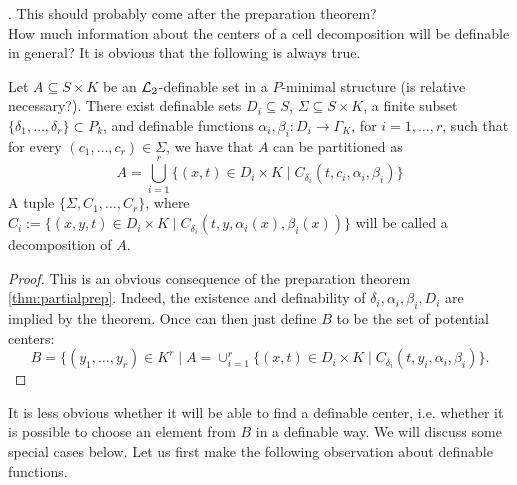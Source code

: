 .{\color{red} This should probably come after the preparation theorem?}\\
How much information about the centers of a cell decomposition will be definable in general?
It is obvious that the following is always true.

\begin{def-theorem}\label{def:celdecB}
Let $A \subseteq S \times K$ be an $\mathcal{L}_2$-definable set in a {\color{red} $P$-minimal structure (is relative necessary?)}. There exist definable sets $D_i \subseteq S$, $\Sigma \subseteq S \times K$, a finite subset $\{\delta_1, \ldots, \delta_r\} \subset P_k$, and definable functions $\alpha_i, \beta_i: D_i \to \Gamma_K$, for $i=1, \ldots, r$, such that for every $(c_1, \ldots, c_r) \in \Sigma$, we have that $A$ can be partitioned as
 \[A =\bigcup_{i=1}^r \{(x,t) \in D_i \times K \mid C_{\delta_i}(t,c_i, \alpha_i, \beta_i)\}\]
 A tuple $\{\Sigma, C_1, \ldots, C_r\}$, where $C_i:= \{(x,y,t) \in D_i \times K \mid C_{\delta_i}(t,y, \alpha_i(x), \beta_i(x))\}$ will be called a  decomposition of $A$.
\end{def-theorem}
\begin{proof}
This is an obvious consequence of the preparation theorem \ref{thm:partialprep}. Indeed, the existence and definability of $\delta_i, \alpha_i, \beta_i, D_i$ are implied by the theorem. Once can then just define $B$ to be the set of potential centers:
\[B = \{(y_1, \ldots, y_r) \in K^r \mid A = \cup_{i=1}^r \{(x,t) \in D_i \times K \mid C_{\delta_i}(t,y_i, \alpha_i, \beta_i)\}.\]
\end{proof}


It is less obvious whether it will be able to find a definable center, i.e. whether it is possible to choose an element from $B$ in a definable way. We will discuss some special cases below.
Let us first make the following observation about definable functions. 


